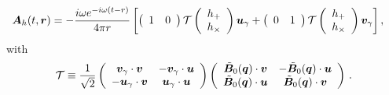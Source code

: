 \documentclass[a4paper,11pt]{article}
\begin{document}
\begin{equation}
\label{eq:AasofT2}
\begin{aligned}
   {\bm A}_{h}(t, {\bm r} ) & = - \frac{i\omega e^{-i \omega (t-r) } }{4 \pi r}
\left[
\left(
\begin{array}{cc}
 1 & 0 
\end{array}\right)
{\cal T}
\left(
\begin{array}{c}
 h_+ \\ h_\times
\end{array}
\right)
\bm{u}_\gamma
+\left(
\begin{array}{cc}
 0 & 1
\end{array}\right)
{\cal T}
\left(
\begin{array}{c}
 h_+ \\ h_\times
\end{array}
\right)\bm{v}_\gamma
\right]
, \,
\end{aligned}
\end{equation}
%
with
%
\begin{eqnarray}
{\cal T} \equiv
\frac{1}{\sqrt{2}} \left(
\begin{array}{cc}
 \bm{v}_\gamma \cdot \bm{v}   & -\bm{v}_\gamma \cdot \bm{u}  \\
 - \bm{u}_\gamma \cdot \bm{v}   & \bm{u}_\gamma \cdot \bm{u}
\end{array}
\right)
\left(
\begin{array}{cc}
 \tilde{\bm{B}}_0 (\bm{q}) \cdot \bm{v} & - \tilde{\bm{B}}_0 (\bm{q}) \cdot \bm{u} \\
 \tilde{\bm{B}}_0 (\bm{q}) \cdot \bm{u}  & \tilde{\bm{B}}_0 (\bm{q}) \cdot \bm{v}
\end{array}
\right)\,.
\label{eq:TmatN}
\end{eqnarray}
%
\end{document}
